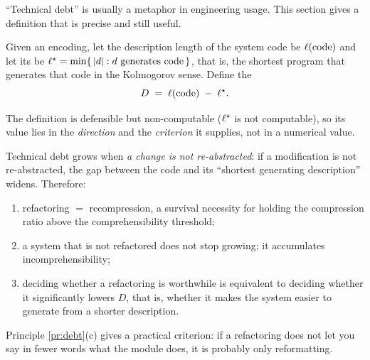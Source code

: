 ``Technical debt'' is usually a metaphor in engineering usage. This section gives a
definition that is precise and still useful.

\begin{definition}\label{def:debt}
Given an encoding, let the description length of the system code be $\ell(\text{code})$ and
let its  be
$\ell^{\star} = \min\{\,|d| : d \text{ generates code}\,\}$, that is, the shortest program
that generates that code in the Kolmogorov sense. Define the 
\begin{equation}\label{eq:debt}
D \;=\; \ell(\text{code}) \;-\; \ell^{\star}.
\end{equation}
\end{definition}

The definition is defensible but non-computable ($\ell^{\star}$ is not computable), so its
value lies in the \emph{direction} and the \emph{criterion} it supplies, not in a numerical
value.

\begin{principle}\label{pr:debt}
Technical debt grows when \emph{a change is not re-abstracted}: if a modification is not
re-abstracted, the gap between the code and its ``shortest generating description'' widens.
Therefore:
\begin{enumerate}[label=(\alph*)]
\item refactoring $=$ recompression, a survival necessity for holding the compression ratio
      above the comprehensibility threshold;
\item a system that is not refactored does not stop growing; it accumulates
      incomprehensibility;
\item deciding whether a refactoring is worthwhile is equivalent to deciding whether it
      significantly lowers $D$, that is, whether it makes the system easier to generate
      from a shorter description.
\end{enumerate}
\end{principle}

Principle \ref{pr:debt}(c) gives a practical criterion: if a refactoring does not let you
say in fewer words what the module does, it is probably only reformatting.

